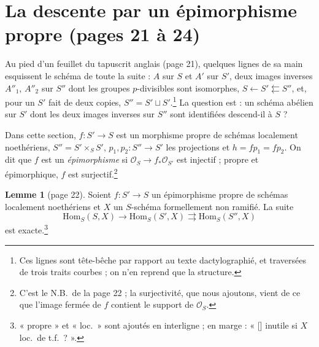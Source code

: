 \documentclass[11pt,a4paper]{article}
\begin{document}

\section*{La descente par un épimorphisme propre (pages 21 à 24)}

Au pied d'un feuillet du tapuscrit anglais (page 21), quelques lignes de sa
main esquissent le schéma de toute la suite : $A$ sur $S$ et $A'$ sur $S'$,
deux images inverses $A''_1$, $A''_2$ sur $S''$ dont les groupes
$p$-divisibles sont isomorphes, $S \leftarrow S' \leftleftarrows S''$, et,
pour un $S'$ fait de deux copies, $S'' = S' \sqcup S'$.\footnote{Ces lignes
sont tête-bêche par rapport au texte dactylographié, et traversées de trois
traits courbes ; on n'en reprend que la structure.} La question est : un
schéma abélien sur $S'$ dont les deux images inverses sur $S''$ sont
identifiées descend-il à $S$ ?

Dans cette section, $f : S' \to S$ est un morphisme propre de schémas
localement noethériens, $S'' = S' \times_S S'$, $p_1, p_2 : S'' \to S'$ les
projections et $h = f p_1 = f p_2$. On dit que $f$ est un
\emph{épimorphisme} si $\mathcal{O}_S \to f_*\mathcal{O}_{S'}$ est injectif ;
propre et épimorphique, $f$ est surjectif.\footnote{C'est le N.B.\ de la page
22 ; la surjectivité, que nous ajoutons, vient de ce que l'image fermée de $f$
contient le support de $\mathcal{O}_S$.}

\textbf{Lemme 1} (page 22). Soient $f : S' \to S$ un épimorphisme propre de
schémas localement noethériens et $X$ un $S$-schéma formellement non ramifié.
La suite
\[
  \mathrm{Hom}_S(S, X) \longrightarrow \mathrm{Hom}_S(S', X)
  \rightrightarrows \mathrm{Hom}_S(S'', X)
\]
est exacte.\footnote{« propre » et « loc.\ » sont ajoutés en interligne ; en
marge : « [\;] inutile si $X$ loc.\ de t.f.\ ? ».}
\end{document}
